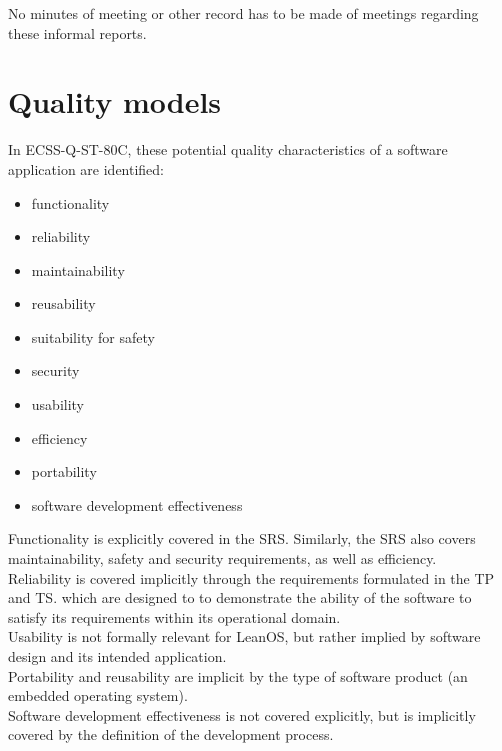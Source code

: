 \noindent
No minutes of meeting or other record has to be made of meetings regarding
these informal reports.


\section{Quality models}

In ECSS-Q-ST-80C\cite{ECSS80C}, these potential quality characteristics of a
software application are identified:

\begin{multicols}{2}
\begin{itemize}
	\item functionality
	\item reliability
	\item maintainability
	\item reusability
	\item suitability for safety
	\item security
	\item usability
	\item efficiency
	\item portability
	\item software development effectiveness
\end{itemize}
\end{multicols}

\noindent
Functionality is explicitly covered in the \gls{SRS}\cite{leanosSRS}. Similarly,
the \gls{SRS} also covers maintainability, safety and security requirements, as
well as efficiency.\\

\noindent
Reliability is covered implicitly through the requirements formulated in the
\gls{TP}\cite{leanosTP} and \gls{TS}\cite{leanosTS}. which are designed to
to demonstrate the ability of the software to satisfy its requirements within
its operational domain.\\

\noindent
Usability is not formally relevant for LeanOS, but rather implied by software
design and its intended application.\\

\noindent
Portability and reusability are implicit by the type of software product
(an embedded operating system).\\

\noindent
Software development effectiveness is not covered explicitly, but is implicitly
covered by the definition of the development process.



